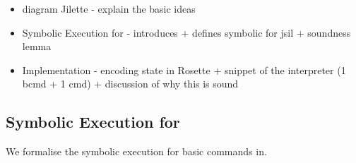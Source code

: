 
\begin{itemize}
  \item diagram Jilette - explain the basic ideas 
  \item Symbolic Execution for  \jsil -  introduces \jsil + defines symbolic for jsil + soundness lemma  
  \item Implementation - encoding \jsil state in Rosette + snippet of the interpreter (1 bcmd + 1 cmd) + discussion of why this is sound
\end{itemize}

\subsection{Symbolic Execution for  \jsil}

We formalise the symbolic execution for \jsil basic commands in. 

